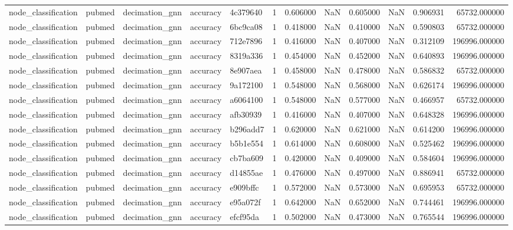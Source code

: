 \begin{tabular}{lllllrrrrrrr}
node_classification & pubmed & decimation_gnn & accuracy & 4c379640 & 1 & 0.606000 & NaN & 0.605000 & NaN & 0.906931 & 65732.000000 \\
node_classification & pubmed & decimation_gnn & accuracy & 6bc9ca08 & 1 & 0.418000 & NaN & 0.410000 & NaN & 0.590803 & 65732.000000 \\
node_classification & pubmed & decimation_gnn & accuracy & 712e7896 & 1 & 0.416000 & NaN & 0.407000 & NaN & 0.312109 & 196996.000000 \\
node_classification & pubmed & decimation_gnn & accuracy & 8319a336 & 1 & 0.454000 & NaN & 0.452000 & NaN & 0.640893 & 196996.000000 \\
node_classification & pubmed & decimation_gnn & accuracy & 8e907aea & 1 & 0.458000 & NaN & 0.478000 & NaN & 0.586832 & 65732.000000 \\
node_classification & pubmed & decimation_gnn & accuracy & 9a172100 & 1 & 0.548000 & NaN & 0.568000 & NaN & 0.626174 & 196996.000000 \\
node_classification & pubmed & decimation_gnn & accuracy & a6064100 & 1 & 0.548000 & NaN & 0.577000 & NaN & 0.466957 & 65732.000000 \\
node_classification & pubmed & decimation_gnn & accuracy & afb30939 & 1 & 0.416000 & NaN & 0.407000 & NaN & 0.648328 & 196996.000000 \\
node_classification & pubmed & decimation_gnn & accuracy & b296add7 & 1 & 0.620000 & NaN & 0.621000 & NaN & 0.614200 & 196996.000000 \\
node_classification & pubmed & decimation_gnn & accuracy & b5b1e554 & 1 & 0.614000 & NaN & 0.608000 & NaN & 0.525462 & 196996.000000 \\
node_classification & pubmed & decimation_gnn & accuracy & cb7ba609 & 1 & 0.420000 & NaN & 0.409000 & NaN & 0.584604 & 196996.000000 \\
node_classification & pubmed & decimation_gnn & accuracy & d14855ae & 1 & 0.476000 & NaN & 0.497000 & NaN & 0.886941 & 65732.000000 \\
node_classification & pubmed & decimation_gnn & accuracy & e909bffc & 1 & 0.572000 & NaN & 0.573000 & NaN & 0.695953 & 65732.000000 \\
node_classification & pubmed & decimation_gnn & accuracy & e95a072f & 1 & 0.642000 & NaN & 0.652000 & NaN & 0.744461 & 196996.000000 \\
node_classification & pubmed & decimation_gnn & accuracy & efcf95da & 1 & 0.502000 & NaN & 0.473000 & NaN & 0.765544 & 196996.000000 \\

\end{tabular}
